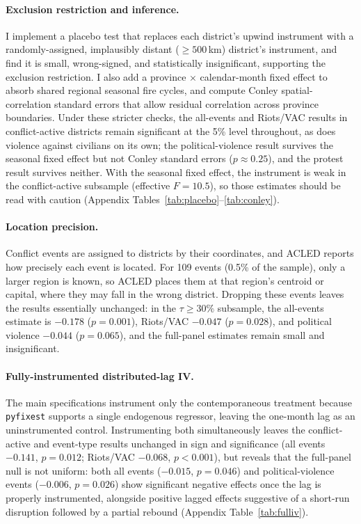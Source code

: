 \documentclass[12pt]{article}
\begin{document}
\paragraph{Exclusion restriction and inference.} I implement a placebo test that replaces each district's upwind instrument with a randomly-assigned, implausibly distant ($\geq 500$\,km) district's instrument, and find it is small, wrong-signed, and statistically insignificant, supporting the exclusion restriction. I also add a province $\times$ calendar-month fixed effect to absorb shared regional seasonal fire cycles, and compute Conley spatial-correlation standard errors that allow residual correlation across province boundaries. Under these stricter checks, the all-events and Riots/VAC results in conflict-active districts remain significant at the 5\% level throughout, as does violence against civilians on its own; the political-violence result survives the seasonal fixed effect but not Conley standard errors ($p \approx 0.25$), and the protest result survives neither. With the seasonal fixed effect, the instrument is weak in the conflict-active subsample (effective $F = 10.5$), so those estimates should be read with caution (Appendix Tables~\ref{tab:placebo}--\ref{tab:conley}).

\paragraph{Location precision.} Conflict events are assigned to districts by their coordinates, and ACLED reports how precisely each event is located. For 109 events (0.5\% of the sample), only a larger region is known, so ACLED places them at that region's centroid or capital, where they may fall in the wrong district. Dropping these events leaves the results essentially unchanged: in the $\tau \geq 30\%$ subsample, the all-events estimate is $-0.178$ ($p=0.001$), Riots/VAC $-0.047$ ($p=0.028$), and political violence $-0.044$ ($p=0.065$), and the full-panel estimates remain small and insignificant.

\paragraph{Fully-instrumented distributed-lag IV.} The main specifications instrument only the contemporaneous treatment because \texttt{pyfixest} supports a single endogenous regressor, leaving the one-month lag as an uninstrumented control. Instrumenting both simultaneously leaves the conflict-active and event-type results unchanged in sign and significance (all events $-0.141$, $p=0.012$; Riots/VAC $-0.068$, $p<0.001$), but reveals that the full-panel null is not uniform: both all events ($-0.015$, $p=0.046$) and political-violence events ($-0.006$, $p=0.026$) show significant negative effects once the lag is properly instrumented, alongside positive lagged effects suggestive of a short-run disruption followed by a partial rebound (Appendix Table~\ref{tab:fulliv}).
\end{document}
